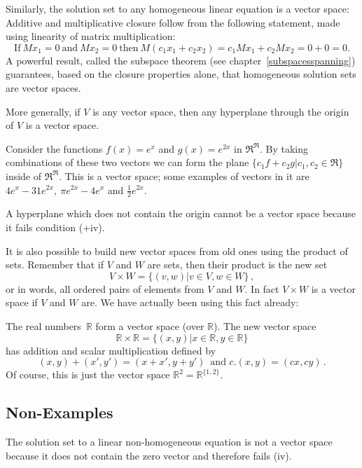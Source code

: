 Similarly, the solution set to any homogeneous linear equation is a vector space:
Additive and multiplicative closure follow from the following statement, made using linearity of matrix multiplication:
\[\text{If}~Mx_1=0 ~\mbox{and}~Mx_2=0~ \mbox{then} ~M(c_1x_1 + c_2x_2)=c_1Mx_1+c_2Mx_2=0+0=0.\] 
A powerful result, called the subspace theorem (see chapter~\ref{subspacesspanning}) guarantees, based on the closure properties alone, that homogeneous
solution sets are vector spaces.

More generally, if $V$ is any vector space, then any hyperplane through the origin of $V$ is a vector space. 

\begin{example} Consider the functions $f(x)=e^x$ and $g(x)=e^{2x}$ in $\Re^\Re$. By taking combinations of these two vectors we can form the plane $\{ c_1 f+ c_2 g | c_1,c_2 \in \Re\}$
inside of $\Re^\Re$. This is a vector space; 
some examples of vectors in it are 
$4e^x-31e^{2x},~\pi e^{2x}-4e^x$ and $\frac12e^{2x}$. 
\end{example}

A hyperplane which does not contain the origin cannot be a vector space because it fails condition (+iv).

It is also possible to build new vector spaces from old ones using the product of sets. Remember that if $V$ and $W$ are sets, then
their product is the new set
\[
V\times W = \{(v,w)|v\in V, w\in W\}\, ,
\]
or in words, all ordered pairs of elements from $V$ and $W$.
In fact $V\times W$ is a vector space if $V$ and $W$ are. We have actually been using this fact already:

\begin{example}
The real numbers~${\mathbb R}$ form a vector space (over ${\mathbb R}$). The new vector space
\[{\mathbb R}\times {\mathbb R}=\{(x,y)|x\in{\mathbb R}, y\in {\mathbb R}\}\]
has addition and scalar multiplication defined by
\[
(x,y)+(x',y')=(x+x',y+y')\, \mbox{ and } c.(x,y)=(cx,cy)\, .
\]
Of course, this is just the vector space ${\mathbb R}^2={\mathbb R}^{\{1,2\}}$. 
\end{example}

\subsection{Non-Examples} 
The solution set to a linear non-homogeneous equation is not a vector space because it does not contain the zero vector and therefore fails (iv).

